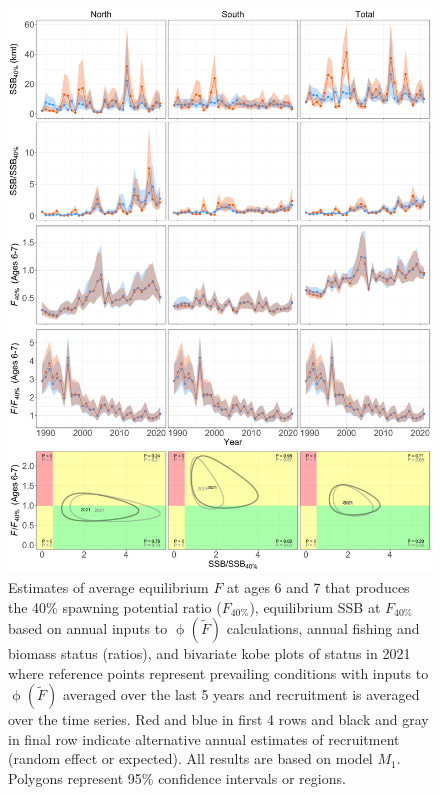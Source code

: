 \documentclass[
]{article}
\begin{document}
\begin{figure}

{\centering \includegraphics[height=0.85\textheight]{brp_status_results} 

}

\caption{Estimates of average equilibrium $F$ at ages 6 and 7 that produces the 40\% spawning potential ratio ($F_{40\%}$), equilibrium SSB at $F_{40\%}$ based on annual inputs to $\upphi(\widetilde{F})$ calculations, annual fishing and biomass status (ratios), and bivariate kobe plots of status in 2021 where reference points represent prevailing conditions with inputs to $\upphi(\widetilde{F})$ averaged over the last 5 years and recruitment is averaged over the time series. Red and blue in first 4 rows and black and gray in final row indicate alternative annual estimates of recruitment (random effect or expected). All results are based on model $M_1$. Polygons represent 95\% confidence intervals or regions.}\label{fig:annual-BRPs}
\end{figure}
\end{document}
